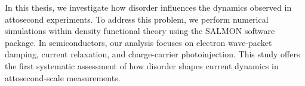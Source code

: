 
In this thesis, we investigate how disorder influences the dynamics observed in attosecond experiments. To address this problem, we perform numerical simulations within density functional theory using the SALMON software package. In semiconductors, our analysis focuses on electron wave-packet damping, current relaxation, and charge-carrier photoinjection. This study offers the first systematic assessment of how disorder shapes current dynamics in attosecond-scale measurements.
